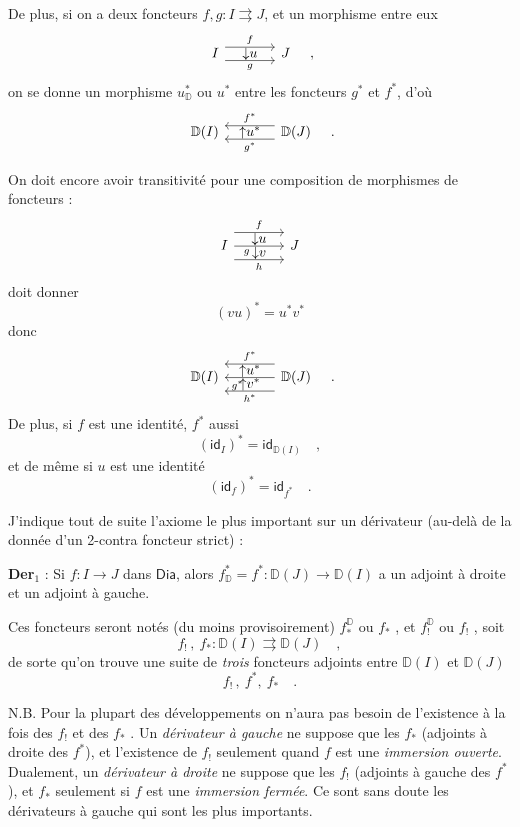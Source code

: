 \documentclass[11pt]{article}
\newcommand{\printedpage}[1]{\marginpar{\footnotesize p.~#1}}
\newcommand{\msp}[1]{\marginpar{\footnotesize [#1]}}
\newcommand{\Dia}{\mathsf{Dia}}
\newcommand{\DD}{\mathbb{D}}
\newcommand{\id}{\mathsf{id}}
\begin{document}
\msp{page 5}

De plus, si on a deux foncteurs $f, g : I \rightrightarrows J$, et un morphisme entre eux
\[
\begin{tikzcd}[column sep=large]
I \arrow[r, shift left=2, "f"] \arrow[r, shift right=2, "g"'] \arrow[r, phantom, "{\downarrow}u"] & J
\end{tikzcd}
\quad ,
\]
on se donne un morphisme $u^*_{\DD}$ ou $u^*$ entre les foncteurs $g^*$ et $f^*$, d'où
\[
\begin{tikzcd}[column sep=large]
\DD(I) & \DD(J) \arrow[l, shift right=2, "f^*"'] \arrow[l, shift left=2, "g^*"] \arrow[l, phantom, "{\uparrow}u^*"]
\end{tikzcd}
\quad .
\]

\printedpage{5}

On doit encore avoir transitivité pour une composition de morphismes de foncteurs :
\[
\begin{tikzcd}[column sep=large]
I \arrow[r, shift left=4, "f"] \arrow[r, "g"' near start] \arrow[r, shift right=4, "h"'] \arrow[r, phantom, shift left=2, "{\downarrow}u"] \arrow[r, phantom, shift right=2, "{\downarrow}v"] & J
\end{tikzcd}
\]
doit donner
\[ (vu)^* = u^*v^* \]
donc
\[
\begin{tikzcd}[column sep=large]
\DD(I) & \DD(J) \arrow[l, shift right=4, "f^*"'] \arrow[l, "g^*" near end] \arrow[l, shift left=4, "h^*"] \arrow[l, phantom, shift right=2, "{\uparrow}u^*"] \arrow[l, phantom, shift left=2, "{\uparrow}v^*"]
\end{tikzcd}
\quad .
\]
De plus, si $f$ est une identité, $f^*$ aussi
\[ (\id_I)^* = \id_{\DD(I)} \quad , \]
et de même si $u$ est une identité
\[ (\id_f)^* = \id_{f^*} \quad . \]

\msp{page 6}

J'indique tout de suite l'axiome le plus important sur un dérivateur (au-delà de la donnée d'un 2-contra foncteur strict) :

\textbf{Der}$_1$ : Si $f : I \to J$ dans $\Dia$, alors $f^*_{\DD} = f^* : \DD(J) \to \DD(I)$ a un adjoint à droite et un adjoint à gauche.

Ces foncteurs seront notés (du moins provisoirement) $f^{\DD}_*$ ou $f_*$ , et $f^{\DD}_!$ ou $f_!$ , soit
\[ f_! \, , \ f_* : \DD(I) \rightrightarrows \DD(J) \quad , \]
de sorte qu'on trouve une suite de \textit{trois} foncteurs adjoints entre $\DD(I)$ et $\DD(J)$
\[ f_! \, , \ f^*, \ f_* \quad . \]

N.B. Pour la plupart des développements on n'aura pas besoin de l'existence à la fois des $f_!$ et des $f_*$ . Un \textit{dérivateur à gauche} ne suppose que les $f_*$ (adjoints à droite des $f^*$), et l'existence de $f_!$ seulement quand $f$ est une \textit{immersion ouverte}. Dualement, un \textit{dérivateur à droite} ne suppose que les $f_!$ (adjoints à gauche des $f^*$), et $f_*$ seulement si $f$ est une \textit{immersion fermée}. Ce sont sans doute les dérivateurs à gauche qui sont les plus importants.
\end{document}

